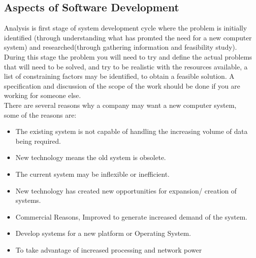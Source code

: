 \subsection{Aspects of Software Development}
  \begin{figure}[H]
    \centering
  \end{figure}
  \noindent
  Analysis is first stage of system development cycle where the problem is initially identified (through understanding what has promted the need for a new computer system) and researched(through gathering information and feasibility study).\\
  During this stage the problem you will need to try and define the actual problems that will need to be solved, and try to be realistic with the resources available, a list of constraining factors may be identified, to obtain a feasible solution. A specification and discussion of the scope of the work should be done if you are working for someone else.\\
  There are several reasons why a company may want a new computer system, some of the reasons are:
  \begin{itemize}
    \setlength\itemsep{0cm}
    \item The existing system is not capable of handling the increasing volume of data being required.
    \item New technology means the old system is obsolete.
    \item The current system may be inflexible or inefficient.
    \item New technology has created new opportunities for expansion/ creation of systems.
    \item Commercial Reasons, Improved to generate increased demand of the system.
    \item Develop systems for a new platform or Operating System.
    \item To take advantage of increased processing and network power
  \end{itemize}
